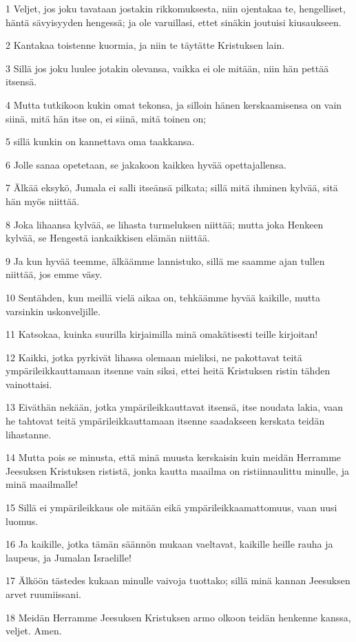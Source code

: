 \par 1 Veljet, jos joku tavataan jostakin rikkomuksesta, niin ojentakaa te, hengelliset, häntä sävyisyyden hengessä; ja ole varuillasi, ettet sinäkin joutuisi kiusaukseen.
\par 2 Kantakaa toistenne kuormia, ja niin te täytätte Kristuksen lain.
\par 3 Sillä jos joku luulee jotakin olevansa, vaikka ei ole mitään, niin hän pettää itsensä.
\par 4 Mutta tutkikoon kukin omat tekonsa, ja silloin hänen kerskaamisensa on vain siinä, mitä hän itse on, ei siinä, mitä toinen on;
\par 5 sillä kunkin on kannettava oma taakkansa.
\par 6 Jolle sanaa opetetaan, se jakakoon kaikkea hyvää opettajallensa.
\par 7 Älkää eksykö, Jumala ei salli itseänsä pilkata; sillä mitä ihminen kylvää, sitä hän myös niittää.
\par 8 Joka lihaansa kylvää, se lihasta turmeluksen niittää; mutta joka Henkeen kylvää, se Hengestä iankaikkisen elämän niittää.
\par 9 Ja kun hyvää teemme, älkäämme lannistuko, sillä me saamme ajan tullen niittää, jos emme väsy.
\par 10 Sentähden, kun meillä vielä aikaa on, tehkäämme hyvää kaikille, mutta varsinkin uskonveljille.
\par 11 Katsokaa, kuinka suurilla kirjaimilla minä omakätisesti teille kirjoitan!
\par 12 Kaikki, jotka pyrkivät lihassa olemaan mieliksi, ne pakottavat teitä ympärileikkauttamaan itsenne vain siksi, ettei heitä Kristuksen ristin tähden vainottaisi.
\par 13 Eiväthän nekään, jotka ympärileikkauttavat itsensä, itse noudata lakia, vaan he tahtovat teitä ympärileikkauttamaan itsenne saadakseen kerskata teidän lihastanne.
\par 14 Mutta pois se minusta, että minä muusta kerskaisin kuin meidän Herramme Jeesuksen Kristuksen rististä, jonka kautta maailma on ristiinnaulittu minulle, ja minä maailmalle!
\par 15 Sillä ei ympärileikkaus ole mitään eikä ympärileikkaamattomuus, vaan uusi luomus.
\par 16 Ja kaikille, jotka tämän säännön mukaan vaeltavat, kaikille heille rauha ja laupeus, ja Jumalan Israelille!
\par 17 Älköön tästedes kukaan minulle vaivoja tuottako; sillä minä kannan Jeesuksen arvet ruumiissani.
\par 18 Meidän Herramme Jeesuksen Kristuksen armo olkoon teidän henkenne kanssa, veljet. Amen.


